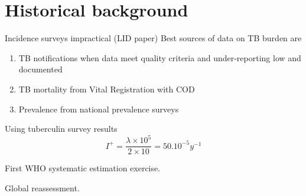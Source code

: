 \section{Historical background}

Incidence surveys impractical (LID paper)
Best sources of data on TB burden are 
\begin{enumerate}
\item TB notifications when data meet quality criteria and under-reporting low and documented
\item TB mortality from Vital Registration with COD
\item Prevalence from national prevalence surveys
\end{enumerate}

Using tuberculin survey results\cite{Styblo1985}
$$I^+ = \frac{\lambda \times 10^5}{2 \times 10} = 50.10^{-5} y^{-1}$$

First WHO systematic estimation exercise\cite{1600578}.

Global reassessment\cite{10517722}.



  
  
  
  
  
  
  